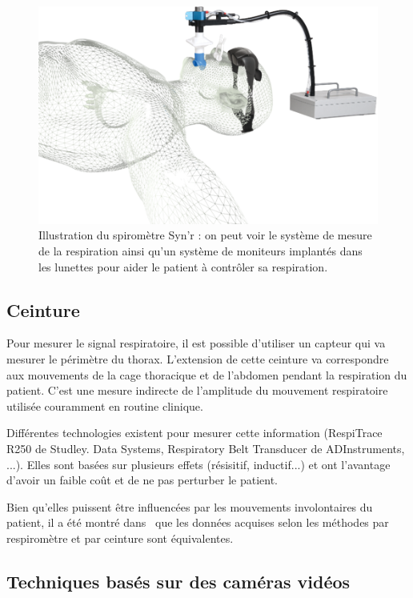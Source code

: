 \begin{figure}[h!]
	\begin{center}
		\includegraphics[width=12cm]{images/spiro}
	\end{center}
	\caption[Illustration du spiromètre Syn'r]{Illustration du spiromètre Syn'r : on peut voir le système de mesure de la respiration ainsi qu'un système de moniteurs implantés dans les lunettes pour aider le patient à contrôler sa respiration.} 
	\label{fig:spirometre}
\end{figure}

\subsection{Ceinture}

Pour mesurer le signal respiratoire, il est possible d'utiliser un capteur qui va mesurer le périmètre du thorax. L'extension de cette ceinture va correspondre aux mouvements de la cage thoracique et de l'abdomen pendant la respiration du patient. C'est une mesure indirecte de l'amplitude du mouvement respiratoire utilisée couramment en routine clinique. 

Différentes technologies existent pour mesurer cette information (RespiTrace R250 de Studley. Data Systems, Respiratory Belt Transducer de ADInstruments, ...). Elles sont basées sur plusieurs effets (résisitif, inductif...) et ont l'avantage d'avoir un faible coût et de ne pas perturber le patient.

Bien qu'elles puissent être influencées par les mouvements involontaires du patient, il a été montré dans~\cite{Guivarch2004Sync} que les données acquises selon les méthodes par respiromètre et par ceinture sont équivalentes.

\subsection{Techniques basés sur des caméras vidéos}


